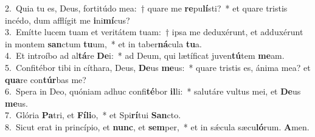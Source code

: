 {2.~}Quia tu es, Deus, fortitúdo mea:~† quare me \textbf{re}pu\textbf{lí}sti?~* et quare tristis incédo, dum afflígit me \textbf{i}ni\textbf{mí}cus?\\
{3.~}Emítte lucem tuam et veritátem tuam:~† ipsa me deduxérunt, et adduxérunt in montem \textbf{san}ctum \textbf{tu}um,~* et in taber\textbf{ná}cula \textbf{tu}a.\\
{4.~}Et introíbo ad al\textbf{tá}re \textbf{De}i:~* ad Deum, qui lætíficat juven\textbf{tú}tem \textbf{me}am.\\
{5.~}Confitébor tibi in cíthara, Deus, \textbf{De}us \textbf{me}us:~* quare tristis es, ánima mea? et \textbf{qua}re con\textbf{túr}bas me?\\
{6.~}Spera in Deo, quóniam adhuc confi\textbf{té}bor \textbf{il}li:~* salutáre vultus mei, et \textbf{De}us \textbf{me}us.\\
{7.~}Glória \textbf{Pa}tri, et \textbf{Fí}\textbf{li}o,~* et Spi\textbf{rí}tui \textbf{San}cto.\\
{8.~}Sicut erat in princípio, et \textbf{nunc}, et \textbf{sem}per,~* et in sǽcula sæcu\textbf{ló}rum. \textbf{A}men.\\
